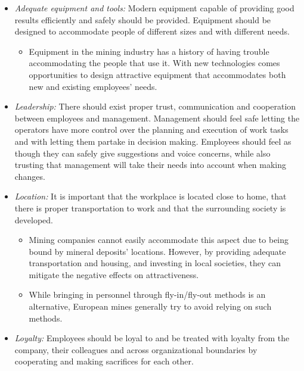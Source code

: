 \documentclass[
  12pt,
]{scrbook}
\providecommand{\tightlist}{%
  \setlength{\itemsep}{0pt}\setlength{\parskip}{0pt}}
\begin{document}
\begin{itemize}
\item
  \emph{Adequate equipment and tools:} Modern equipment capable of providing good results efficiently and safely should be provided. Equipment should be designed to accommodate people of different sizes and with different needs.

  \begin{itemize}
  \tightlist
  \item
    Equipment in the mining industry has a history of having trouble accommodating the people that use it. With new technologies comes opportunities to design attractive equipment that accommodates both new and existing employees' needs.
  \end{itemize}
\item
  \emph{Leadership:} There should exist proper trust, communication and cooperation between employees and management. Management should feel safe letting the operators have more control over the planning and execution of work tasks and with letting them partake in decision making. Employees should feel as though they can safely give suggestions and voice concerns, while also trusting that management will take their needs into account when making changes.
\item
  \emph{Location:} It is important that the workplace is located close to home, that there is proper transportation to work and that the surrounding society is developed.

  \begin{itemize}
  \item
    Mining companies cannot easily accommodate this aspect due to being bound by mineral deposits' locations. However, by providing adequate transportation and housing, and investing in local societies, they can mitigate the negative effects on attractiveness.
  \item
    While bringing in personnel through fly-in/fly-out methods is an alternative, European mines generally try to avoid relying on such methods.
  \end{itemize}
\item
  \emph{Loyalty:} Employees should be loyal to and be treated with loyalty from the company, their colleagues and across organizational boundaries by cooperating and making sacrifices for each other.


\end{itemize}
\end{document}

